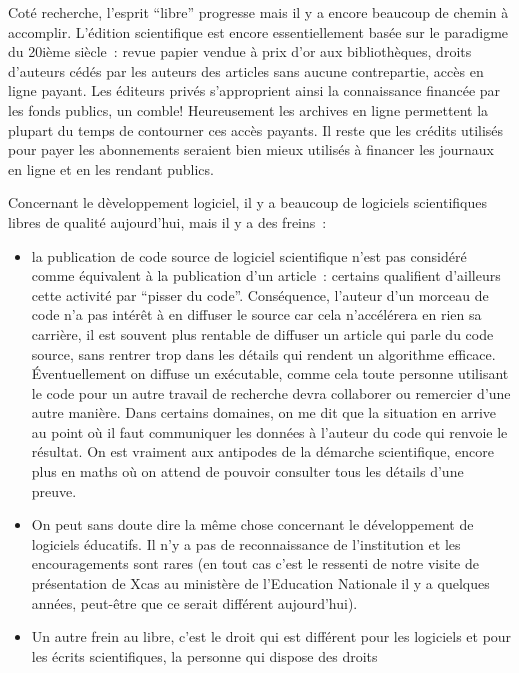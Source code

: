 \documentclass[a4paper,11pt]{book}
\begin{document}
\begin{giacjshere}
Cot\'e recherche, l'esprit ``libre'' progresse mais il y a encore
beaucoup de chemin \`a accomplir. L'\'edition scientifique
est encore essentiellement bas\'ee sur le paradigme du 20i\`eme
si\`ecle~: revue papier vendue \`a prix d'or aux biblioth\`eques,
droits d'auteurs c\'ed\'es par les auteurs des articles sans aucune
contrepartie, acc\`es en ligne payant. Les \'editeurs priv\'es
s'approprient ainsi la connaissance financ\'ee par les fonds publics,
un comble!
Heureusement les archives en ligne permettent la plupart
du temps de contourner ces acc\`es payants. Il reste
que les cr\'edits utilis\'es pour payer les abonnements seraient
bien mieux utilis\'es \`a financer les journaux en ligne et en
les rendant publics.

Concernant le d\`eveloppement logiciel,
il y a beaucoup de logiciels scientifiques libres de qualit\'e aujourd'hui, mais
il y a des freins~:
\begin{itemize}
\item la publication de code source de logiciel scientifique n'est pas
consid\'er\'e comme \'equivalent \`a la publication d'un article~:
certains qualifient d'ailleurs cette activit\'e par ``pisser du
code''. 
Cons\'equence, l'auteur d'un morceau de code n'a pas int\'er\^et
\`a en diffuser le source car cela n'acc\'el\'erera en rien
sa carri\`ere, il est souvent plus rentable
de diffuser un article qui parle du code source,
sans rentrer trop dans les
d\'etails qui rendent un algorithme efficace. \'Eventuellement
on diffuse un ex\'ecutable,
comme cela toute personne utilisant le code pour un autre
travail de recherche devra collaborer
ou remercier d'une autre mani\`ere. Dans certains
domaines, on me dit que la situation en arrive au point
o\`u il faut communiquer
les donn\'ees \`a l'auteur du code qui renvoie le r\'esultat.
On est vraiment aux antipodes de la d\'emarche scientifique,
encore plus en maths o\`u on attend de pouvoir consulter
tous les d\'etails d'une preuve.
\item On peut sans doute dire la m\^eme chose concernant
le d\'eveloppement de logiciels
\'educatifs. Il n'y a pas de reconnaissance de l'institution et
les encouragements sont rares (en tout cas c'est le ressenti
de notre visite de pr\'esentation de Xcas
au minist\`ere de l'Education Nationale
il y a quelques ann\'ees, peut-\^etre que ce serait diff\'erent
aujourd'hui).
\item Un autre frein au libre, c'est le droit qui est diff\'erent pour les logiciels
et pour les \'ecrits scientifiques, la personne qui dispose des droits

\end{itemize}
\end{giacjshere}
\end{document}
